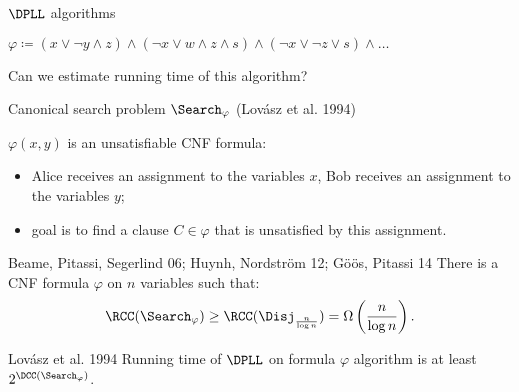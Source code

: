 \begin{frame}{$\DPLL$ algorithms}

    $\varphi \coloneqq (x \lor \neg{y} \land z) \land (\neg{x} \lor w \land z \land s) \land
    (\neg{x} \lor \neg{z} \lor s) \land \dots$

    \pause
    \begin{center}
    	    
    \end{center}

    \vspace{0.1cm}
        
	\pause
    \pause
    \pause
    \pause

    Can we estimate running time of this algorithm?

\end{frame}

\begin{frame}{Canonical search problem $\Search_{\varphi}$ (Lov{\'{a}}sz et al. 1994)}
    
    $\varphi(x, y)$ is an unsatisfiable CNF formula:
    \begin{itemize}
        \item Alice receives an assignment to the variables $x$, Bob receives an assignment to the
            variables $y$;
        \item goal is to find a clause $C \in \varphi$ that is unsatisfied by this assignment.
    \end{itemize}

    \pause

    \begin{block}{Beame, Pitassi, Segerlind 06; Huynh, Nordstr{\"{o}}m 12; G{\"{o}}{\"{o}}s, Pitassi 14}
        There is a CNF formula $\varphi$ on $n$ variables such that:
        $$\RCC(\Search_{\varphi}) \ge \RCC(\Disj_{\frac{n}{\log n}}) = \Omega\left( \frac{n}{\log n} \right).$$
    \end{block}

    \begin{block}{Lov{\'{a}}sz et al. 1994}
        Running time of $\DPLL$ on formula $\varphi$ algorithm is at least $2^{\DCC(\Search_{\varphi})}$.
    \end{block}
\end{frame}

